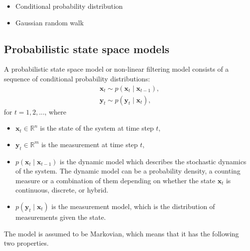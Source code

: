 \begin{itemize}
    \item Conditional probability distribution %
    \item Gaussian random walk
\end{itemize}

\subsection{Probabilistic state space models}
\begin{definition}
A probabilistic state space model or non-linear filtering model consists of a sequence of conditional probability distributions: 
\begin{align}
&\mathbf{x}_t \sim p(\mathbf{x}_t \mid \mathbf{x}_{t-1}), \nonumber \\
&\mathbf{y}_t \sim p(\mathbf{y}_t \mid \mathbf{x}_t),
\end{align}
for $t=1,2,...$, where 
\begin{itemize}
    \item $\mathbf{x}_t \in \mathbb{R}^n$ is the state of the system at time step $t$,
    \item $\mathbf{y}_t \in \mathbb{R}^m$ is the measurement at time step $t$, 
    \item $p(\mathbf{x}_t\mid \mathbf{x}_{t-1})$ is the dynamic model which describes the stochastic dynamics of the system. The dynamic model can be a probability density, a counting measure or a combination of them depending on whether the state $\mathbf{x}_t$ is continuous, discrete, or hybrid. 
    \item $p(\mathbf{y}_t\mid \mathbf{x}_t)$ is the measurement model, which is the distribution of measurements given the state. 
\end{itemize}
The model is assumed to be Markovian, which means that it has the following two properties. 
\end{definition}

